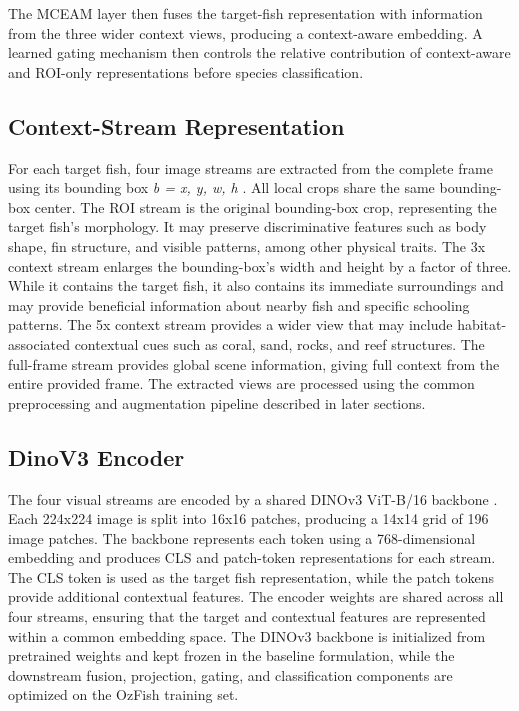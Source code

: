 \documentclass[preprint,12pt]{elsarticle}
\providecommand{\RL}[1]{#1}
\begin{document}
The MCEAM layer \citep{ref26} then fuses the
target-fish representation with information from the three wider context
views, producing a context-aware embedding. A learned gating mechanism
then controls the relative contribution of context-aware and ROI-only
representations before species classification.

\subsection{Context-Stream
Representation}\label{context-stream-representation}

For each target fish, four image streams are extracted from the complete
frame using its bounding box \emph{b = x, y, w, h}
\citep{ref26}. All local crops share the same
bounding-box center. The ROI stream is the original bounding-box crop,
representing the target fish's morphology. It may preserve
discriminative features such as body shape, fin structure, and visible
patterns, among other physical traits. The 3x context stream enlarges
the bounding-box's width and height by a factor of three. While it
contains the target fish, it also contains its immediate surroundings
and may provide beneficial information about nearby fish and specific
schooling patterns. The 5x context stream provides a wider view that may
include habitat-associated contextual cues such as coral, sand, rocks,
and reef structures. The full-frame stream provides global scene
information, giving full context from the entire provided frame. The
extracted views are processed using the common preprocessing and
augmentation pipeline described in later sections.\RL{}

\subsection{DinoV3 Encoder}\label{dinov3-encoder}

The four visual streams are encoded by a shared DINOv3 ViT-B/16 backbone
\citep{ref25,ref36}. Each 224x224 image is split into
16x16 patches, producing a 14x14 grid of 196 image patches. The backbone
represents each token using a 768-dimensional embedding and produces CLS
and patch-token representations for each stream. The CLS token is used
as the target fish representation, while the patch tokens provide
additional contextual features. The encoder weights are shared across
all four streams, ensuring that the target and contextual features are
represented within a common embedding space. The DINOv3 backbone is
initialized from pretrained weights \citep{ref25}
and kept frozen in the baseline formulation, while the downstream
fusion, projection, gating, and classification components are optimized
on the OzFish training set.
\end{document}
